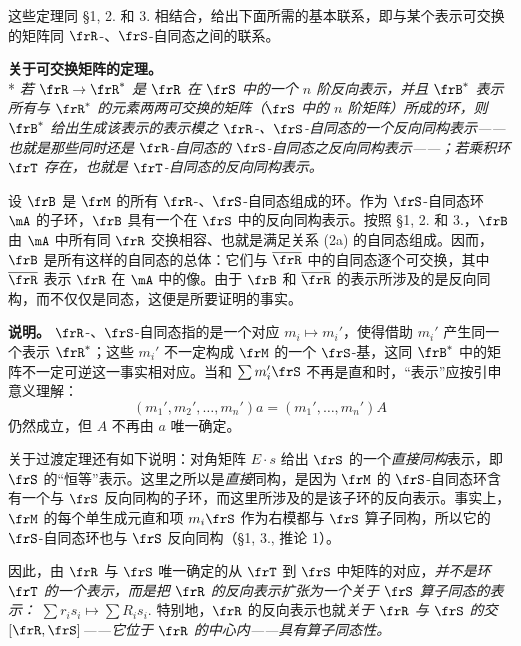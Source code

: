 这些定理同 §1, 2. 和 3. 相结合，给出下面所需的基本联系，即与某个表示可交换的矩阵同 \(\frR\)-、\(\frS\)-自同态之间的联系。

\noindent\textbf{关于可交换矩阵的定理。}\\*
\emph{若 \(\frR\to\frR^*\) 是 \(\frR\) 在 \(\frS\) 中的一个 \(n\) 阶反向表示，并且 \(\frB^*\) 表示所有与 \(\frR^*\) 的元素两两可交换的矩阵（\(\frS\) 中的 \(n\) 阶矩阵）所成的环，则 \(\frB^*\) 给出生成该表示的表示模之 \(\frR\)-、\(\frS\)-自同态的一个反向同构表示——也就是那些同时还是 \(\frR\)-自同态的 \(\frS\)-自同态之反向同构表示——；若乘积环 \(\frT\) 存在，也就是 \(\frT\)-自同态的反向同构表示。}

设 \(\frB\) 是 \(\frM\) 的所有 \(\frR\)-、\(\frS\)-自同态组成的环。作为 \(\frS\)-自同态环 \(\mA\) 的子环，\(\frB\) 具有一个在 \(\frS\) 中的反向同构表示。按照 §1, 2. 和 3.，\(\frB\) 由 \(\mA\) 中所有同 \(\frR\) 交换相容、也就是满足关系 (2a) 的自同态组成。因而，\(\frB\) 是所有这样的自同态的总体：它们与 \(\overline{\frR}\) 中的自同态逐个可交换，其中 \(\overline{\frR}\) 表示 \(\frR\) 在 \(\mA\) 中的像。由于 \(\frB\) 和 \(\overline{\frR}\) 的表示所涉及的是反向同构，而不仅仅是同态，这便是所要证明的事实。

\noindent\textbf{说明。} \(\frR\)-、\(\frS\)-自同态指的是一个对应 \(m_i\mapsto m_i'\)，使得借助 \(m_i'\) 产生同一个表示 \(\frR^*\)；这些 \(m_i'\) 不一定构成 \(\frM\) 的一个 \(\frS\)-基，这同 \(\frB^*\) 中的矩阵不一定可逆这一事实相对应。当和 \(\sum m_i'\frS\) 不再是直和时，“表示”应按引申意义理解：
\[
        (m_1',m_2',\ldots,m_n')a=(m_1',\ldots,m_n')A
\]
仍然成立，但 \(A\) 不再由 \(a\) 唯一确定。

关于过渡定理还有如下说明：对角矩阵 \(E\cdot s\) 给出 \(\frS\) 的一个\emph{直接同构}表示，即 \(\frS\) 的“恒等”表示。这里之所以是\emph{直接}同构，是因为 \(\frM\) 的 \(\frS\)-自同态环含有一个与 \(\frS\) 反向同构的子环，而这里所涉及的是该子环的反向表示。事实上，\(\frM\) 的每个单生成元直和项 \(m_i\frS\) 作为右模都与 \(\frS\) 算子同构，所以它的 \(\frS\)-自同态环也与 \(\frS\) 反向同构（§1, 3., 推论 1）。

因此，由 \(\frR\) 与 \(\frS\) 唯一确定的从 \(\frT\) 到 \(\frS\) 中矩阵的对应，\emph{并不是环 \(\frT\) 的一个表示，而是把 \(\frR\) 的反向表示扩张为一个关于 \(\frS\) 算子同态的表示：} \(\sum r_i s_i\longmapsto \sum R_i s_i.\)
特别地，\(\frR\) 的反向表示也就\emph{关于 \(\frR\) 与 \(\frS\) 的交 \([\frR,\frS]\)——它位于 \(\frR\) 的中心内——具有算子同态性。}
